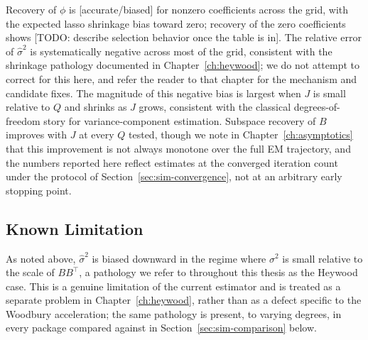 \begin{table}[htbp]
\centering
% 
\caption{Bias and MSE of $\hat\phi$ and $\hat\mu$, reported separately for zero and nonzero coefficients, across the simulation grid.}
\label{tab:recovery-phi-mu}
\end{table}

\begin{table}[htbp]
\centering
% 
\caption{Relative error of $\hat\sigma^2$, with Monte Carlo standard errors, across the simulation grid.}
\label{tab:recovery-sigma2}
\end{table}

\begin{table}[htbp]
\centering
% 
\caption{Subspace distance $d(\hat B, B^\ast)$, with Monte Carlo standard errors, across the simulation grid.}
\label{tab:recovery-B}
\end{table}

Recovery of $\phi$ is [accurate/biased] for nonzero coefficients across the grid, with the expected lasso shrinkage bias toward zero; recovery of the zero coefficients shows [TODO: describe selection behavior once the table is in]. The relative error of $\hat\sigma^2$ is systematically negative across most of the grid, consistent with the shrinkage pathology documented in Chapter~\ref{ch:heywood}; we do not attempt to correct for this here, and refer the reader to that chapter for the mechanism and candidate fixes. The magnitude of this negative bias is largest when $J$ is small relative to $Q$ and shrinks as $J$ grows, consistent with the classical degrees-of-freedom story for variance-component estimation. Subspace recovery of $B$ improves with $J$ at every $Q$ tested, though we note in Chapter~\ref{ch:asymptotics} that this improvement is not always monotone over the full EM trajectory, and the numbers reported here reflect estimates at the converged iteration count under the protocol of Section~\ref{sec:sim-convergence}, not at an arbitrary early stopping point.

\subsection{Known Limitation}
\label{sec:heywood-limitation}

As noted above, $\hat\sigma^2$ is biased downward in the regime where $\sigma^2$ is small relative to the scale of $BB^\top$, a pathology we refer to throughout this thesis as the Heywood case. This is a genuine limitation of the current estimator and is treated as a separate problem in Chapter~\ref{ch:heywood}, rather than as a defect specific to the Woodbury acceleration; the same pathology is present, to varying degrees, in every package compared against in Section~\ref{sec:sim-comparison} below.


